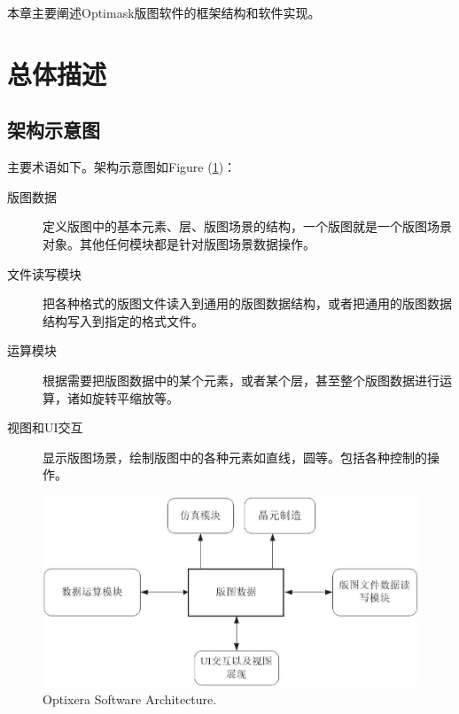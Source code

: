 本章主要阐述Optimask版图软件的框架结构和软件实现。

\section{总体描述} \label{SectArchRule}
\subsection{架构示意图} \label{SectArchView} 
主要术语如下。架构示意图如Figure (\ref{FigLayoutArch})：
\begin{description}
	\item[版图数据] 定义版图中的基本元素、层、版图场景的结构，一个版图就是一个版图场景对象。其他任何模块都是针对版图场景数据操作。
	\item[文件读写模块] 把各种格式的版图文件读入到通用的版图数据结构，或者把通用的版图数据结构写入到指定的格式文件。
	\item[运算模块] 根据需要把版图数据中的某个元素，或者某个层，甚至整个版图数据进行运算，诸如旋转平缩放等。
	\item[视图和UI交互] 显示版图场景，绘制版图中的各种元素如直线，圆等。包括各种控制的操作。
\end{description}

\begin{figure}[htb!p] %
	\centering
	\includegraphics[width=6in]{./Layout/FigsArch/LayoutArchitect.eps}
	\caption{Optixera Software Architecture.}
	\label{FigLayoutArch}
\end{figure}

